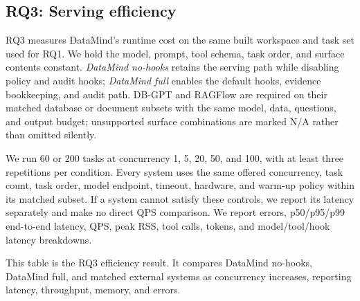 \subsection{RQ3: Serving efficiency}
\label{sec:eval-rq3}

RQ3 measures DataMind's runtime cost on the same built workspace and task set
used for RQ1. We hold the model, prompt, tool schema, task order, and surface
contents constant. \emph{DataMind no-hooks} retains the serving path while
disabling policy and audit hooks; \emph{DataMind full} enables the default
hooks, evidence bookkeeping, and audit path. DB-GPT and RAGFlow are required
on their matched database or document subsets with the same model, data,
questions, and output budget; unsupported surface combinations are marked N/A
rather than omitted silently.

We run 60 or 200 tasks at concurrency 1, 5, 20, 50, and 100, with at least
three repetitions per condition. Every system uses the same offered
concurrency, task count, task order, model endpoint, timeout, hardware, and
warm-up policy within its matched subset. If a system cannot satisfy these
controls, we report its latency separately and make no direct QPS comparison.
We report errors, p50/p95/p99 end-to-end latency, QPS, peak RSS, tool calls,
tokens, and model/tool/hook latency breakdowns.

This table is the RQ3 efficiency result. It compares DataMind no-hooks, DataMind full, and matched external systems as concurrency increases, reporting latency, throughput, memory, and errors.

